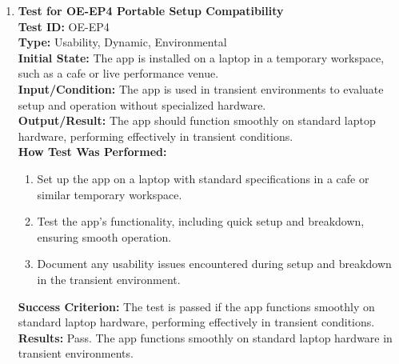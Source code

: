 \documentclass[12pt, titlepage]{article}
\begin{document}
\begin{enumerate}
    \item \textbf{Test for OE-EP4 Portable Setup Compatibility} \\
      \newline
      \textbf{Test ID:} OE-EP4 \\
      \textbf{Type:} Usability, Dynamic, Environmental \\
      \textbf{Initial State:} The app is installed on a laptop in a temporary workspace, such as a cafe or live performance venue. \\
      \textbf{Input/Condition:} The app is used in transient environments to evaluate setup and operation without specialized 
      hardware. \\
      \textbf{Output/Result:} The app should function smoothly on standard laptop hardware, performing effectively in transient 
      conditions. \\
      \textbf{How Test Was Performed:}
      \begin{enumerate}
          \item Set up the app on a laptop with standard specifications in a cafe or similar temporary workspace.
          \item Test the app’s functionality, including quick setup and breakdown, ensuring smooth operation.
          \item Document any usability issues encountered during setup and breakdown in the transient environment.
      \end{enumerate}
      \textbf{Success Criterion:} The test is passed if the app functions smoothly on standard laptop hardware, performing effectively in transient conditions.\\
      \textbf{Results:} Pass. The app functions smoothly on standard laptop hardware in transient environments.\\


\end{enumerate}
\end{document}
